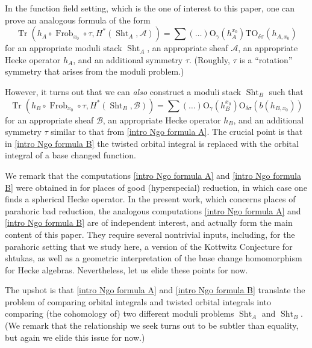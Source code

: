 \documentclass[reqno]{amsart}
\numberwithin{equation}{section}
\newcommand{\Cal}[1]{\mathcal{#1}}
\newcommand{\mrm}[1]{\mathrm{#1}}
\DeclareMathOperator{\Frob}{Frob}
\DeclareMathOperator{\Tr}{Tr}
\DeclareMathOperator{\Sht}{Sht}
\theoremstyle{remark}
\numberwithin{equation}{section}
\begin{document}
In the function field setting, which is the one of interest to this paper, one can prove an analogous formula of the form
\begin{equation}\label{intro Ngo formula A}
\Tr(h_A \circ \Frob_{x_0}\circ \tau, H^*(\Sht_A, \Cal{A})) = \sum (\ldots) \mrm{O}_{\gamma} (h_A^{x_0}) \mrm{TO}_{\delta \sigma}(h_{A,x_0})
\end{equation}
for an appropriate moduli stack $\Sht_A$, an appropriate sheaf $\Cal{A}$, an appropriate Hecke operator $h_A$, and an additional symmetry $\tau$. (Roughly, $\tau$ is a ``rotation'' symmetry that arises from the moduli problem.) 

However, it turns out that we can \emph{also} construct a moduli stack $\Sht_B$ such that 
\begin{equation}\label{intro Ngo formula B}
\Tr(h_B \circ \Frob_{x_0} \circ \tau, H^*(\Sht_B, \Cal{B})) = \sum (\ldots) \mrm{O}_{\gamma} (h_B^{x_0}) \mrm{O}_{\delta \sigma}(b(h_{B,x_0}))
\end{equation}
for an appropriate sheaf $\Cal{B}$, an appropriate Hecke operator $h_B$, and an additional symmetry $\tau$ similar to that from \eqref{intro Ngo formula A}. The crucial point is that in \eqref{intro Ngo formula B} the twisted orbital integral is replaced with the orbital integral of a base changed function. 

We remark that the computations \eqref{intro Ngo formula A} and \eqref{intro Ngo formula B} were obtained in \cite{Ngo06} for places of good (hyperspecial) reduction, in which case one finds a spherical Hecke operator. In the present work, which concerns places of parahoric bad reduction, the analogous computations \eqref{intro Ngo formula A} and \eqref{intro Ngo formula B} are of independent interest, and actually form the main content of this paper. They require several nontrivial inputs, including, for the parahoric setting that we study here, a version of the Kottwitz Conjecture for shtukas, as well as a geometric interpretation of the base change homomorphism for Hecke algebras. Nevertheless, let us elide these points for now.

The upshot is that \eqref{intro Ngo formula A} and \eqref{intro Ngo formula B} translate the problem of comparing orbital integrals and twisted orbital integrals into comparing (the cohomology of) two different moduli problems $\Sht_A$ and $\Sht_B$. (We remark that the relationship we seek turns out to be subtler than equality, but again we elide this issue for now.) 
\end{document}
